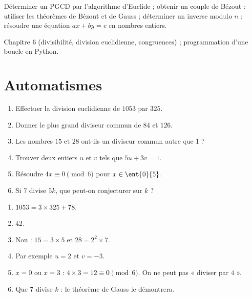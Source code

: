 
\begin{objectives}
Déterminer un PGCD par l'algorithme d'Euclide ; obtenir un couple de Bézout ; utiliser les théorèmes de Bézout et de Gauss ; déterminer un inverse modulo $n$ ; résoudre une équation $ax+by=c$ en nombres entiers.
\end{objectives}
\begin{prerequisites}
Chapitre 6 (divisibilité, division euclidienne, congruences) ; programmation d'une boucle en Python.
\end{prerequisites}

\section{Automatismes}
\begin{fluency}
\begin{enumerate}
\item Effectuer la division euclidienne de $\num{1053}$ par $325$.
\item Donner le plus grand diviseur commun de $84$ et $126$.
\item Les nombres $15$ et $28$ ont-ils un diviseur commun autre que $1$ ?
\item Trouver deux entiers $u$ et $v$ tels que $5u+3v=1$.
\item Résoudre $4x\equiv0\pmod{6}$ pour $x\in\ent{0}{5}$.
\item Si $7$ divise $5k$, que peut-on conjecturer sur $k$ ?
\end{enumerate}
\end{fluency}
\begin{solution}[Automatismes]
\begin{enumerate}
\item $\num{1053}=3\times325+78$.
\item $42$.
\item Non : $15=3\times5$ et $28=2^2\times7$.
\item Par exemple $u=2$ et $v=-3$.
\item $x=0$ ou $x=3$ : $4\times3=12\equiv0\pmod6$. On ne peut pas « diviser par $4$ ».
\item Que $7$ divise $k$ : le théorème de Gauss le démontrera.
\end{enumerate}
\end{solution}

